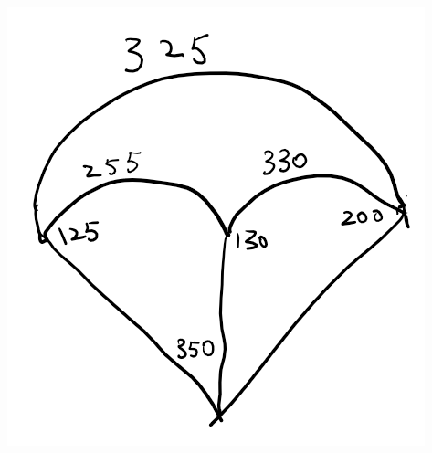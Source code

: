 \documentclass[12pt]{article}
\newenvironment{answer}[2][Answer]{\begin{trivlist}
\item[\hskip \labelsep {\bfseries #1}\hskip \labelsep {\bfseries #2.}]}{\end{trivlist}}
\begin{document}
\begin{answer}{1b}\end{answer}
\includegraphics[scale=0.5]{hku-ccst9017-assignment-4-img-001}



\end{document}
